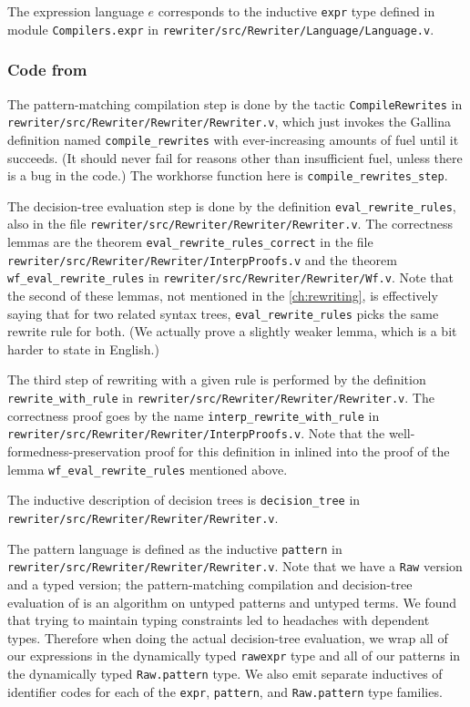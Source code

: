 \begin{subappendices}
The expression language $e$ corresponds to the inductive \texttt{expr} type defined in module \texttt{Compilers.expr} in \texttt{rewriter/src/Rewriter/Language/Language.v}.

\subsubsection{Code from }

The pattern-matching compilation step is done by the tactic \texttt{CompileRewrites} in \texttt{rewriter/src/Rewriter/Rewriter/Rewriter.v}, which just invokes the Gallina definition named \texttt{compile\_rewrites} with ever-increasing amounts of fuel until it succeeds.
(It should never fail for reasons other than insufficient fuel, unless there is a bug in the code.)
The workhorse function here is \texttt{compile\_rewrites\_step}.

The decision-tree evaluation step is done by the definition \texttt{eval\_rewrite\_rules}, also in the file \texttt{rewriter/src/Rewriter/Rewriter/Rewriter.v}.
The correctness lemmas are the theorem \texttt{eval\_rewrite\_rules\_correct} in the file \texttt{rewriter/src/Rewriter/Rewriter/InterpProofs.v} and the theorem \texttt{wf\_eval\_rewrite\_rules} in \texttt{rewriter/src/Rewriter/Rewriter/Wf.v}.
Note that the second of these lemmas, not mentioned in the \autoref{ch:rewriting}, is effectively saying that for two related syntax trees, \texttt{eval\_rewrite\_rules} picks the same rewrite rule for both.
(We actually prove a slightly weaker lemma, which is a bit harder to state in English.)

The third step of rewriting with a given rule is performed by the definition \texttt{rewrite\_with\_rule} in \texttt{rewriter/src/Rewriter/Rewriter/Rewriter.v}.
The correctness proof goes by the name \texttt{interp\_rewrite\_with\_rule} in \texttt{rewriter/src/Rewriter/Rewriter/InterpProofs.v}.
Note that the well-formedness-preservation proof for this definition in inlined into the proof of the lemma \verb|wf_eval_rewrite_rules| mentioned above.

The inductive description of decision trees is \verb|decision_tree| in \texttt{rewriter/src/Rewriter/Rewriter/Rewriter.v}.

The pattern language is defined as the inductive \verb|pattern| in \texttt{rewriter/src/Rewriter/Rewriter/Rewriter.v}.
Note that we have a \verb|Raw| version and a typed version; the pattern-matching compilation and decision-tree evaluation of \textcite{Aehlig} is an algorithm on untyped patterns and untyped terms.
We found that trying to maintain typing constraints led to headaches with dependent types.
Therefore when doing the actual decision-tree evaluation, we wrap all of our expressions in the dynamically typed \verb|rawexpr| type and all of our patterns in the dynamically typed \verb|Raw.pattern| type.
We also emit separate inductives of identifier codes for each of the \verb|expr|, \verb|pattern|, and \verb|Raw.pattern| type families.


\end{subappendices}
